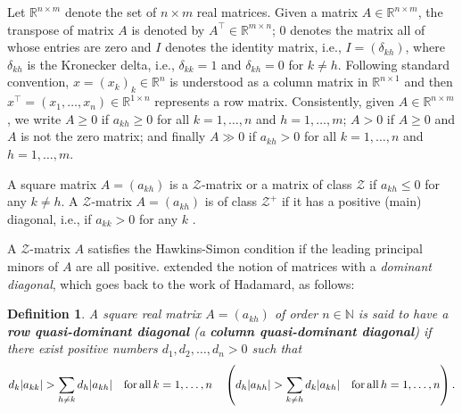 \documentclass[11pt,fleqn]{article}
\newtheorem{definition}[theorem]{Definition}
\begin{document}
Let $\mathbb{R}^{n \times m}$ denote the set of $n \times m$ real matrices.  Given a matrix $A\in \mathbb R^{n\times m}$, the transpose of matrix $A$ is denoted by $A^\top\in \mathbb R^{m \times n}$; $0$ denotes the matrix all of whose entries are zero and $I$ denotes the identity matrix, i.e., $I = (\delta_{kh})$, where $\delta_{kh}$ is the Kronecker delta, i.e., $\delta_{kk} = 1$ and $\delta_{kh} = 0$ for $k \neq h$. Following standard convention, $x = (x_k)_k \in \mathbb{R}^n$ is understood as a column matrix in $\mathbb{R}^{n \times 1}$ and then $x^\top=(x_1, \ldots, x_n) \in \mathbb{R}^{1 \times n}$ represents a row matrix. Consistently, given $A \in \mathbb{R}^{n \times m}$, we write $A \geqslant 0$ if $a_{kh} \geqslant 0$ for all $k = 1, \ldots, n$ and $h = 1, \ldots, m$; $A > 0$ if $A \geqslant 0$ and $A$ is not the zero matrix; and finally $A \gg 0$ if $a_{kh} > 0$ for all $k = 1, \ldots, n$ and $h = 1, \ldots, m$. 

A square matrix $A=(a_{kh})$ is a $\mathcal{Z}$-matrix or a matrix of class $\mathcal{Z}$ if $a_{kh}\leqslant 0$ for any $k \neq h$. A $\mathcal{Z}$-matrix $A=(a_{kh})$ is of class $\mathcal{Z}^+$ if it has a positive (main) diagonal, i.e., if $a_{kk}>0$ for any $k$ \citep{Giorgi2022}.

A $\mathcal{Z}$-matrix $A$ satisfies the Hawkins-Simon condition \citep{HawkinsSimon1949} if the leading principal minors of $A$ are all positive. \citet{McKenzie1960} extended the notion of matrices with a \emph{dominant diagonal}, which goes back to the work of Hadamard, as follows:

\begin{definition}\label{def:p.q.d.d.}
	A square real matrix $A=(a_{kh})$ of order $n \in \mathbb N$ is said to have a \textbf{row quasi-dominant diagonal} (a \textbf{column  quasi-dominant diagonal}) if there exist positive numbers $d_1, d_2, \ldots, d_n>0$ such that
	\[
	d_k|a_{kk}|> \sum_{h\neq k}d_h|a_{kh}|\quad {\rm for \,all\,}k=1,\ldots, n \quad \left(d_h|a_{hh}|> \sum_{k\neq h}d_k|a_{kh}|\quad {\rm for \,all\,}h=1,\ldots, n \right) .
	\]
\end{definition}
\end{document}
